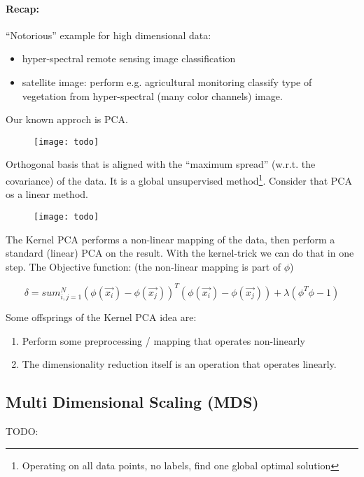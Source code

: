 \paragraph{Recap:}
``Notorious'' example for high dimensional data:
\begin{itemize}
    \item hyper-spectral remote sensing image classification
    \item satellite image:  perform e.g. agricultural monitoring classify type of vegetation from hyper-spectral (many color channels) image.
\end{itemize}

Our known approch is PCA.

\begin{figure}[H]
	\centering
	\texttt{[image: todo]}
\end{figure}

Orthogonal basis that is aligned with the ``maximum spread'' (w.r.t. the covariance) of the data. It is a global unsupervised method\footnote{Operating on all data points, no labels, find one global optimal solution}. Consider that PCA os a linear method.

\begin{figure}[H]
	\centering
	\texttt{[image: todo]}
\end{figure}

The Kernel PCA performs a non-linear mapping of the data, then perform a standard (linear) PCA on the result. With the kernel-trick we can do that in one step. The Objective function: (the non-linear mapping is part of $\phi$)

\begin{equation*}
    \delta = sum_{i,j=1}^{N} (\phi(\vec{x_i}) - \phi(\vec{x_j}))^T (\phi(\vec{x_i}) - \phi(\vec{x_j})) + \lambda (\phi^T\phi-1)
\end{equation*}

Some offsprings of the Kernel PCA idea are:
\begin{enumerate}
    \item Perform some preprocessing / mapping that operates non-linearly
    \item The dimensionality reduction itself is an operation that operates linearly.
\end{enumerate}

\subsection{Multi Dimensional Scaling (MDS)}
TODO:

